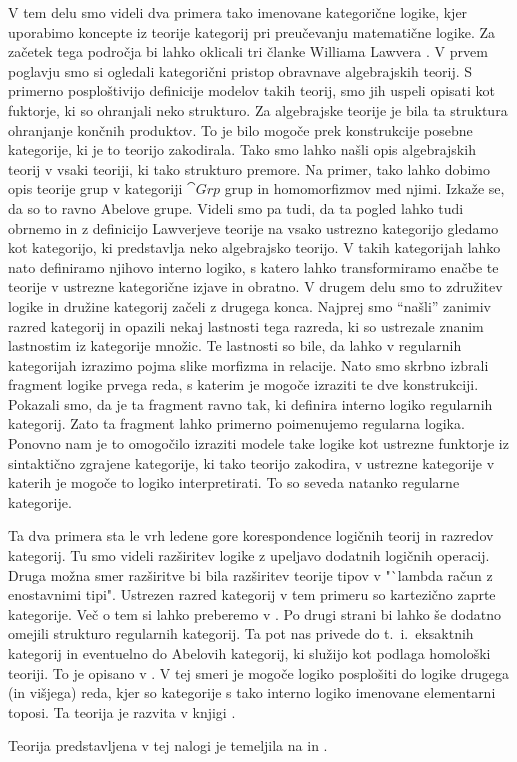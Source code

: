 \documentclass[../kategoricna_logika.tex]{subfiles}
\begin{document}
V tem delu smo videli dva primera tako imenovane kategorične logike, kjer uporabimo
koncepte iz teorije kategorij pri preučevanju matematične logike.
Za začetek tega področja bi lahko oklicali tri članke Williama Lawvera \cite{lawvere1963functorial,lawvere1964elementary,lawvere1971quantifiers}.
V prvem poglavju smo si ogledali kategorični pristop obravnave algebrajskih teorij.
S primerno posploštivijo definicije modelov takih teorij, smo jih uspeli opisati
kot fuktorje, ki so ohranjali neko strukturo.
Za algebrajske teorije je bila ta struktura ohranjanje končnih produktov.
To je bilo mogoče prek konstrukcije posebne kategorije, ki je to teorijo zakodirala.
Tako smo lahko našli opis algebrajskih teorij v vsaki teoriji, ki tako strukturo premore.
Na primer, tako lahko dobimo opis teorije grup v kategoriji $\cat{Grp}$ grup in
homomorfizmov med njimi. Izkaže se, da so to ravno Abelove grupe.
Videli smo pa tudi, da ta pogled lahko tudi obrnemo in z definicijo Lawverjeve teorije
na vsako ustrezno kategorijo gledamo kot kategorijo, ki predstavlja neko algebrajsko
teorijo. V takih kategorijah lahko nato definiramo njihovo interno logiko, s katero
lahko transformiramo enačbe te teorije v ustrezne kategorične izjave in obratno.
V drugem delu smo to združitev logike in družine kategorij začeli z drugega konca.
Najprej smo "`našli"' zanimiv razred kategorij in opazili nekaj lastnosti tega razreda,
ki so ustrezale znanim lastnostim iz kategorije množic. Te lastnosti so bile, da lahko
v regularnih kategorijah izrazimo pojma slike morfizma in relacije. Nato smo skrbno
izbrali fragment logike prvega reda, s katerim je mogoče izraziti te dve konstrukciji.
Pokazali smo, da je ta fragment ravno tak, ki definira interno logiko regularnih kategorij.
Zato ta fragment lahko primerno poimenujemo regularna logika.
Ponovno nam je to omogočilo izraziti modele take logike kot ustrezne funktorje iz sintaktično
zgrajene kategorije, ki tako teorijo zakodira, v ustrezne kategorije v katerih je
mogoče to logiko interpretirati. To so seveda natanko regularne kategorije.

Ta dva primera sta le vrh ledene gore korespondence logičnih teorij in razredov kategorij.
Tu smo videli razširitev logike z upeljavo dodatnih logičnih operacij. Druga možna smer
razširitve bi bila razširitev teorije tipov v "`lambda račun z enostavnimi tipi". Ustrezen
razred kategorij v tem primeru so kartezično zaprte kategorije. Več o tem si lahko preberemo
v \cite{seely1984locally}. Po drugi strani bi lahko še dodatno omejili strukturo regularnih
kategorij. Ta pot nas privede do t.\ i.\ eksaktnih kategorij in eventuelno do Abelovih kategorij,
ki služijo kot podlaga homološki teoriji. To je opisano v \cite{barr-exact-categories}.
V tej smeri je mogoče logiko posplošiti do logike drugega (in višjega) reda, kjer so
kategorije s tako interno logiko imenovane elementarni toposi. Ta teorija je razvita v
knjigi \cite{TJohnstone2002-TJOSOA-2}.

Teorija predstavljena v tej nalogi je temeljila na \cite{algebraic-logic} in \cite{barr-exact-categories}.
\end{document}
